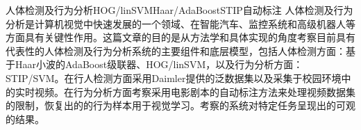 
\begin{Cabstract}{人体检测及行为分析}{HOG/linSVM}{Haar/AdaBoost}{STIP}{自动标注}
人体检测及行为分析是计算机视觉中快速发展的一个领域、在智能汽车、监控系统和高级机器人等方面具有关键性作用。这篇文章的目的是从方法学和具体实现的角度考察目前具有代表性的人体检测及行为分析系统的主要组件和底层模型，包括人体检测方面：基于Haar小波的AdaBoost级联器\cite{haar}、HOG/linSVM\cite{DT2005}，以及行为分析方面：STIP/SVM\cite{stip}。在行人检测方面采用Daimler提供的泛数据集以及采集于校园环境中的实时视频。在行为分析方面考察采用电影剧本的自动标注方法来处理视频数据集的限制，恢复出的的行为样本用于视觉学习。考察的系统对特定任务呈现出的可观的结果。
\end{Cabstract}
